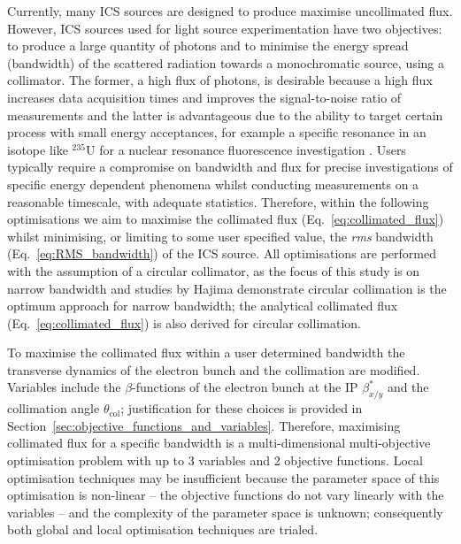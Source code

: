 \documentclass[../main.tex]{subfiles}
\begin{document}
Currently, many ICS sources \cite{deitrick2017inverse,deitrick2018high,pan2019design,dupraz2020thomx} are designed to produce maximise uncollimated flux. However, ICS sources used for light source experimentation have two objectives: to produce a large quantity of photons and to minimise the energy spread (bandwidth) of the scattered radiation towards a monochromatic source, using a collimator. The former, a high flux of photons, is desirable because a high flux increases data acquisition times and improves the signal-to-noise ratio of measurements and the latter is advantageous due to the ability to target certain process with small energy acceptances, for example a specific resonance in an isotope like $^{235}\mathrm{U}$ for a nuclear resonance fluorescence investigation \cite{hayakawa2010nondestructive}. Users typically require a compromise on bandwidth and flux for precise investigations of specific energy dependent phenomena whilst conducting measurements on a reasonable timescale, with adequate statistics. Therefore, within the following optimisations we aim to maximise the collimated flux (Eq.~\ref{eq:collimated_flux}) whilst minimising, or limiting to some user specified value, the \textit{rms} bandwidth (Eq.~\ref{eq:RMS_bandwidth}) of the ICS source. All optimisations are performed with the assumption of a circular collimator, as the focus of this study is on narrow bandwidth and studies by Hajima \cite{hajima2021bandwidth} demonstrate circular collimation is the optimum approach for narrow bandwidth; the analytical collimated flux (Eq.~\ref{eq:collimated_flux}) is also derived for circular collimation.

To maximise the collimated flux within a user determined bandwidth the transverse dynamics of the electron bunch and the collimation are modified. Variables include the $\beta$-functions of the electron bunch at the IP $\beta^{*}_{x/y}$ and the collimation angle $\theta_{\mathrm{col}}$; justification for these choices is provided in Section~\ref{sec:objective_functions_and_variables}. Therefore, maximising collimated flux for a specific bandwidth is a multi-dimensional multi-objective optimisation problem with up to 3 variables and 2 objective functions. Local optimisation techniques may be insufficient because the parameter space of this optimisation is non-linear -- the objective functions do not vary linearly with the variables -- and the complexity of the parameter space is unknown; consequently both global and local optimisation techniques are trialed.
\end{document}
